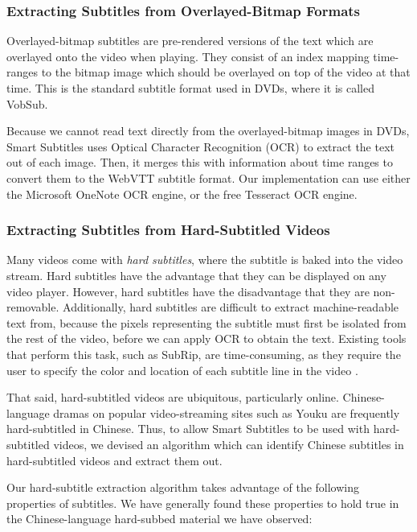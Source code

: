 \documentclass{sigchi}
\begin{document}
\subsubsection{Extracting Subtitles from Overlayed-Bitmap Formats}

Overlayed-bitmap subtitles are pre-rendered versions of the text which are overlayed onto the video when playing. They consist of an index mapping time-ranges to the bitmap image which should be overlayed on top of the video at that time. This is the standard subtitle format used in DVDs, where it is called VobSub.

Because we cannot read text directly from the overlayed-bitmap images in DVDs, Smart Subtitles uses Optical Character Recognition (OCR) to extract the text out of each image. Then, it merges this with information about time ranges to convert them to the WebVTT subtitle format. Our implementation can use either the Microsoft OneNote \cite{onenote} OCR engine, or the free Tesseract \cite{tesseract} OCR engine.

\subsubsection{Extracting Subtitles from Hard-Subtitled Videos}

Many videos come with \emph{hard subtitles}, where the subtitle is baked into the video stream. Hard subtitles have the advantage that they can be displayed on any video player. However, hard subtitles have the disadvantage that they are non-removable. Additionally, hard subtitles are difficult to extract machine-readable text from, because the pixels representing the subtitle must first be isolated from the rest of the video, before we can apply OCR to obtain the text. Existing tools that perform this task, such as SubRip, are time-consuming, as they require the user to specify the color and location of each subtitle line in the video \cite{subrip}.

That said, hard-subtitled videos are ubiquitous, particularly online. Chinese-language dramas on popular video-streaming sites such as Youku are frequently hard-subtitled in Chinese. Thus, to allow Smart Subtitles to be used with hard-subtitled videos, we devised an algorithm which can identify Chinese subtitles in hard-subtitled videos and extract them out.

Our hard-subtitle extraction algorithm takes advantage of the following properties of subtitles. We have generally found these properties to hold true in the Chinese-language hard-subbed material we have observed:
\end{document}
